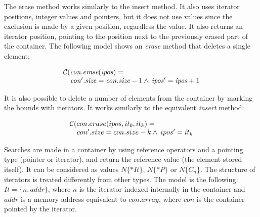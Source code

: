 \documentclass[conference]{IEEEtran}
\newcommand{\comment}[1]{}
\begin{document}
The erase method works similarly to the insert method. It also uses iterator
positions, integer values and pointers, but it does not use values since the exclusion
is made by a given position, regardless the value. It also returns an iterator position,
pointing to the position next to the previously erased part of the container.
The following model shows an \textit{erase} method that deletes a single element:

\[\begin{array}{ll}
\multicolumn{2}{l}{{\cal C}(\textit{con.erase}(\mathit{ipos})=}\\
  & \mathit{con}'\mathit{.size} = \mathit{con.size} - 1 \wedge \: \mathit{ipos}' = \mathit{ipos} + 1
\end{array}\]

It is also possible to delete a number of elements from the container by
marking the bounds with iterators. It works similarly to the equivalent
\textit{insert} method:

\[\begin{array}{ll}
\multicolumn{2}{l}{{\cal C}(con.erase(ipos, it_0, it_k)=}\\
  & 	con'.size = con.size - k \wedge \: ipos' = it_k
\end{array}\]

Searches are made in a container by using reference operators
and a pointing type (pointer or iterator), and return the reference
value (the element stored itself). It can be considered as values
$N\{*It\}$, $N\{*P\}$ or $N\{C_n\}$.	The structure of iterators
is treated differently from other types. The model is the following:
$It = \{n, addr\}$,
where $n$ is the iterator indexed
internally in the container and $addr$ is a memory
address equivalent to $con.array$, where $con$ is the container
pointed by the iterator.


\comment{
To build the operational model, it is important
to define a class structure that is as close as to the
real implementation so that ESBMC++ can correctly identify
the relationships between classes in a given program and
then introduce such relationships to build the AST.}
\end{document}
